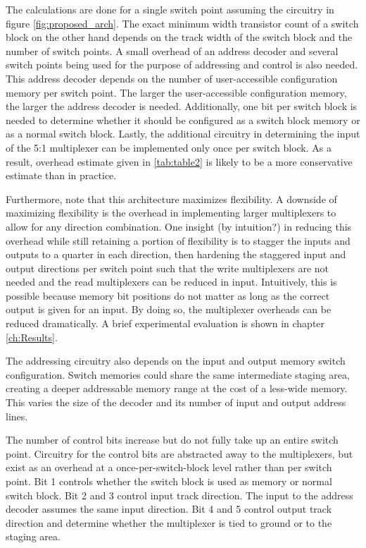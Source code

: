 The calculations are done for a single switch point assuming the circuitry in figure \ref{fig:proposed_arch}. The exact minimum width transistor count of a switch block on the other hand depends on the track width of the switch block and the number of switch points. A small overhead of an address decoder and several switch points being used for the purpose of addressing and control is also needed. This address decoder depends on the number of user-accessible configuration memory per switch point. The larger the user-accessible configuration memory, the larger the address decoder is needed. Additionally, one bit per switch block is needed to determine whether it should be configured as a switch block memory or as a normal switch block.
Lastly, the additional circuitry in determining the input of the 5:1 multiplexer can be implemented only once per switch block.
As a result, overhead estimate given in \ref{tab:table2} is likely to be a more conservative estimate than in practice.

Furthermore, note that this architecture maximizes flexibility. A downside of maximizing flexibility is the overhead in implementing larger multiplexers to allow for any direction combination. One insight (by intuition?) in reducing this overhead while still retaining a portion of flexibility is to stagger the inputs and outputs to a quarter in each direction, then hardening the staggered input and output directions per switch point such that the write multiplexers are not needed and the read multiplexers can be reduced in input.
Intuitively, this is possible because memory bit positions do not matter as long as the correct output is given for an input.
By doing so, the multiplexer overheads can be reduced dramatically. A brief experimental evaluation is shown in chapter \ref{ch:Results}.

The addressing circuitry also depends on the input and output memory switch configuration. Switch memories could share the same intermediate staging area, creating a deeper addressable memory range at the cost of a less-wide memory. This varies the size of the decoder and its number of input and output address lines.

The number of control bits increase but do not fully take up an entire switch point. Circuitry for the control bits are abstracted away to the multiplexers, but exist as an overhead at a once-per-switch-block level rather than per switch point.
Bit 1 controls whether the switch block is used as memory or normal switch block. Bit 2 and 3 control input track direction. The input to the address decoder assumes the same input direction. Bit 4 and 5 control output track direction and determine whether the multiplexer is tied to ground or to the staging area.

